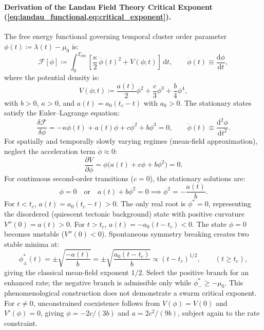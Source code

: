 \paragraph{Derivation of the Landau Field Theory Critical Exponent
(\cref{eq:landau_functional,eq:critical_exponent}).}
The free energy functional governing temporal cluster order
parameter $\phi(t) \coloneqq \lambda(t) - \mu_0$ is:
\begin{equation}
  \mathcal{F}[\phi] \coloneqq \int_0^{T_{\mathrm{obs}}} \left[
    \frac{\kappa}{2}\,\dot{\phi}(t)^2
  + V(\phi; t) \right] \,\mathrm{d}t, \qquad \dot{\phi}(t) \equiv
  \frac{\mathrm{d}\phi}{\mathrm{d}t},
\end{equation}
where the potential density is:
\begin{equation}
  V(\phi; t) \coloneqq \frac{a(t)}{2}\phi^2 + \frac{c}{3}\phi^3 +
  \frac{b}{4}\phi^4,
\end{equation}
with $b > 0$, $\kappa > 0$, and $a(t) = a_0(t_c - t)$ with $a_0 > 0$.
The stationary states satisfy the Euler--Lagrange equation:
\begin{equation}
  \frac{\delta\mathcal{F}}{\delta\phi} = -\kappa \ddot{\phi}(t) +
  a(t)\phi + c\phi^2 + b\phi^3 = 0, \qquad \ddot{\phi}(t) \equiv
  \frac{\mathrm{d}^2\phi}{\mathrm{d}t^2}.
\end{equation}
For spatially and temporally slowly varying regimes (mean-field
approximation), neglect the acceleration term $\ddot{\phi} \approx 0$:
\begin{equation}
  \frac{\partial V}{\partial \phi} = \phi \bigl(a(t) + c\phi +
  b\phi^2\bigr) = 0.
\end{equation}
For continuous second-order transitions ($c = 0$), the stationary
solutions are:
\begin{equation}
  \phi = 0 \quad \text{or} \quad a(t) + b\phi^2 = 0 \implies \phi^2
  = -\frac{a(t)}{b}.
\end{equation}
For $t < t_c$, $a(t) = a_0(t_c - t) > 0$. The only real root is
$\phi^* = 0$, representing the disordered
(quiescent tectonic background) state with positive curvature
$V''(0) = a(t) > 0$.
For $t > t_c$, $a(t) = -a_0(t - t_c) < 0$. The state $\phi = 0$
becomes unstable ($V''(0) < 0$).
Spontaneous symmetry breaking creates two stable minima at:
\begin{equation}
  \phi_\pm^*(t) = \pm \sqrt{\frac{-a(t)}{b}} = \pm\sqrt{\frac{a_0(t -
  t_c)}{b}} \propto (t - t_c)^{1/2}, \qquad (t \ge t_c),
\end{equation}
giving the classical mean-field exponent $1/2$. Select the positive
branch for an enhanced rate; the negative branch is admissible only
while $\phi_-^*\ge-\mu_0$. This phenomenological construction does not
demonstrate a swarm critical exponent. For $c\ne0$, unconstrained
coexistence follows from $V(\phi)=V(0)$ and $V'(\phi)=0$, giving
$\phi=-2c/(3b)$ and $a=2c^2/(9b)$, subject again to the rate constraint.

